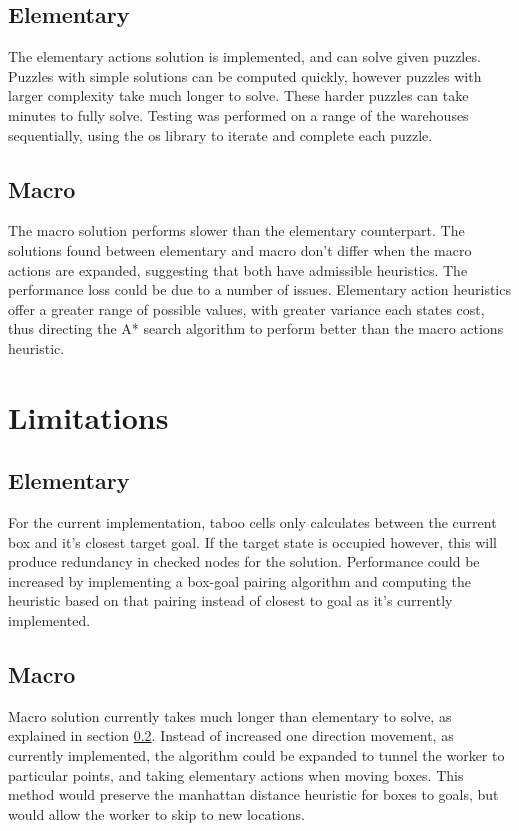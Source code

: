 \documentclass[]{article}
\begin{document}
\subsection{Elementary}
The elementary actions solution is implemented, and can solve given puzzles. Puzzles with simple solutions can be computed quickly, however puzzles with larger complexity take much longer to solve. These harder puzzles can take minutes to fully solve. Testing was performed on a range of the warehouses sequentially, using the os library to iterate and complete each puzzle. 
\subsection{Macro}
\label{Macro}
The macro solution performs slower than the elementary counterpart. The solutions found between elementary and macro don't differ when the macro actions are expanded, suggesting that both have admissible heuristics. The performance loss could be due to a number of issues. Elementary action heuristics offer a greater range of possible values, with greater variance each states cost, thus directing the A* search algorithm to perform better than the macro actions heuristic.  
\section{Limitations}
\subsection{Elementary}
For the current implementation, taboo cells only calculates between the current box and it's closest target goal. If the target state is occupied however, this will produce redundancy in checked nodes for the solution. Performance could be increased by implementing a box-goal pairing algorithm and computing the heuristic based on that pairing instead of closest to goal as it's currently implemented.
\subsection{Macro}
Macro solution currently takes much longer than elementary to solve, as explained in section \ref{Macro}. Instead of increased one direction movement, as currently implemented, the algorithm could be expanded to tunnel the worker to particular points, and taking elementary actions when moving boxes. This method would preserve the manhattan distance heuristic for boxes to goals, but would allow the worker to skip to new locations. 
\end{document}
